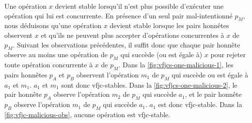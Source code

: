 Une opération $x$ devient stable lorsqu'il n'est plus possible d'exécuter une opération qui lui est concurrente.
En présence d'un seul pair mal-intentionné $p_M$, nous déduisons qu'une opération $x$ devient stable lorsque les pairs honnêtes observent $x$ et qu'ils ne peuvent plus accepter d'opérations concurrentes à $x$ de $p_M$.
Suivant les observations précédentes, il suffit donc que chaque pair honnête observe au moins une opération de $p_M$ qui succède (ou est égale à) $x$ pour rejeter toute opération concurrente à $x$ de $p_M$.
Dans la \autoref{fig:vfjcs-one-malicious-1}, les pairs honnêtes $p_A$ et $p_B$ observent l'opération $m_1$ de $p_M$ qui succède ou est égale à $a_1$ et $m_1$.
$a_1$ et $m_1$ sont donc vfjc-stables.
Dans la \autoref{fig:vfjcs-one-malicious-2}, le pair honnête $p_A$ observe l'opération $m_2$ de $p_M$ qui succède $a_1$, et le pair honnête $p_B$ observe l'opération $m_1$ de $p_M$ qui succède $a_1$.
$a_1$ est donc vfjc-stable.
Dans la \autoref{fig:vfjc-malicious-obs}, aucune opération est vfjc-stable.

